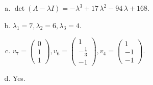 \begin{questions}
\begin{solution}
\begin{enumerate}[(a)]
\item $\det(A-\lambda I)=-{\lambda}^{3} + 17 \, {\lambda}^{2} - 94 \, {\lambda} + 168$.
\item ${\lambda}_1=7, {\lambda}_2=6, {\lambda}_3=4$.
\item $v_{7}=\left(\begin{array}{r}
0 \\
1 \\
1
\end{array}\right), v_{6}=\left(\begin{array}{r}
1 \\
-\frac{1}{3} \\
-1
\end{array}\right), v_{4}=\left(\begin{array}{r}
1 \\
-1 \\
-1
\end{array}\right)$.
\item Yes.
\end{enumerate}
\end{solution}

\end{questions}

\newpage


\begin{center}
\end{center}

